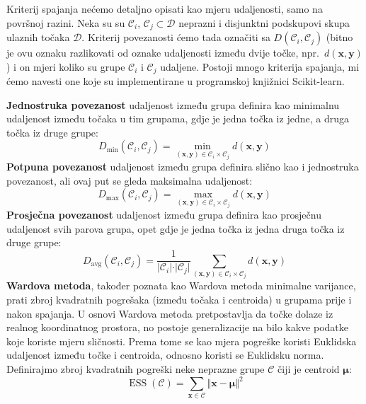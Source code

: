 \documentclass[times, utf8, zavrsni]{fer}
\begin{document}
Kriterij spajanja nećemo detaljno opisati kao mjeru udaljenosti, samo na površnoj razini. Neka su su $\mathcal{C}_i$, $\mathcal{C}_j \subset \mathcal{D}$ neprazni i disjunktni podskupovi skupa ulaznih točaka $\mathcal{D}$. Kriterij povezanosti ćemo tada označiti sa $D \left(\mathcal{C}_i, \mathcal{C}_j\right)$ (bitno je ovu oznaku razlikovati od oznake udaljenosti između dvije točke, npr.\ $d \left(\mathbf{x}, \mathbf{y}\right)$) i on mjeri koliko su grupe $\mathcal{C}_i$ i $\mathcal{C}_j$ udaljene. Postoji mnogo kriterija spajanja, mi ćemo navesti one koje su implementirane u programskoj knjižnici Scikit-learn.

\textbf{Jednostruka povezanost}  udaljenost između grupa definira kao minimalnu udaljenost između točaka u tim grupama, gdje je jedna točka iz jedne, a druga točka iz druge grupe:
\[D_{\text{min}} \left( \mathcal{C}_i, \mathcal{C}_j \right) 
        = \min_{\left(\mathbf{x}, \mathbf{y}\right) \in \mathcal{C}_i \times \mathcal{C}_j} d\left(\mathbf{x}, \mathbf{y}\right)
\]
\textbf{Potpuna povezanost}  udaljenost između grupa definira slično kao i jednostruka povezanost, ali ovaj put se gleda maksimalna udaljenost:
\[D_{\text{max}} \left( \mathcal{C}_i, \mathcal{C}_j \right) 
        = \max_{\left(\mathbf{x}, \mathbf{y}\right) \in \mathcal{C}_i \times \mathcal{C}_j} d\left(\mathbf{x}, \mathbf{y}\right)
\]
\textbf{Prosječna povezanost}  udaljenost između grupa definira kao prosječnu udaljenost svih parova grupa, opet gdje je jedna točka iz jedna druga točka iz druge grupe:
\[D_{\text{avg}} \left( \mathcal{C}_i, \mathcal{C}_j \right) 
        = \frac{1}{\vert \mathcal{C}_i \vert \cdot \vert \mathcal{C}_j \vert} 
            \sum_{\left(\mathbf{x}, \mathbf{y}\right) \in \mathcal{C}_i \times \mathcal{C}_j} d\left(\mathbf{x}, \mathbf{y}\right)
\]
\textbf{Wardova metoda}, također poznata kao Wardova metoda minimalne varijance, prati zbroj kvadratnih pogrešaka (između točaka i centroida) u grupama prije i nakon spajanja. U osnovi Wardova metoda pretpostavlja da točke dolaze iz realnog koordinatnog prostora, no postoje generalizacije na bilo kakve podatke koje koriste mjeru sličnosti. Prema tome se kao mjera pogreške koristi Euklidska udaljenost između točke i centroida, odnosno koristi se Euklidsku norma. Definirajmo zbroj kvadratnih pogreški  neke neprazne grupe $\mathcal{C}$ čiji je centroid $\boldsymbol{\mu}$:
\[\operatorname{ESS} \left(\mathcal{C}\right) = \sum_{\mathbf{x} \in \mathcal{C}} 
\Vert \mathbf{x} - \boldsymbol{\mu} \Vert^2\]
\end{document}
